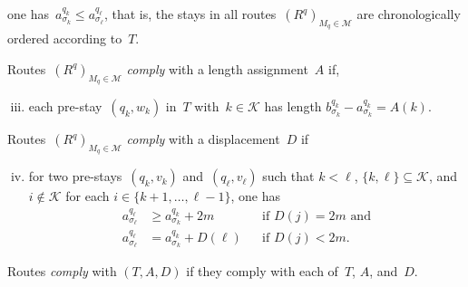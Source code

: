 \documentclass[natbib,sort,smallextended,envcountsame,envcountsect,numbook]{svjour3}
\newcommand{\ps}{pre-stay}
\newcommand{\las}{length assignment}
\newcommand{\dis}{displacement}
\newcommand{\Ms}{\mathcal M}
\newcommand{\nmach}{m}
\begin{document}
\begin{definition}
\begin{enumerate}[(i)]
  one has~\(a_{\sigma_k}^{q_k}\leq a_{\sigma_{\ell}}^{q_\ell}\), that is,
  the stays in all routes~\((R^{q})_{M_q\in\Ms}\) are chronologically ordered according to~\(T\).
\end{enumerate}
  Routes~\((R^q)_{M_q\in\Ms}\)  \emph{comply} with a \las~\(A\) if,
\begin{enumerate}[(i)]
\setcounter{enumi}{2}
\item\label{la1} each \ps{}~\((q_k,w_k)\) in~\(T\) with~\(k\in\mathcal K\)
has length \(b_{\sigma_k}^{q_k}-a_{\sigma_k}^{q_k}=A(k)\).
\end{enumerate}
Routes~\((R^q)_{M_q\in\Ms}\)  \emph{comply} with a \dis~\(D\) if
\begin{enumerate}[(i)]
\setcounter{enumi}{3}
\item\label{dis1} for two \ps{}s~\(({q_k},v_k)\) and~\(({q_\ell},v_\ell)\) such that \(k<\ell\), \(\{k,\ell\}\subseteq\mathcal K\), and \(i\notin\mathcal K\) for each \(i\in\{k+1,\dots,\ell-1\}\), one has
  \begin{align*}
    a_{\sigma_\ell}^{q_\ell}&\geq a_{\sigma_k}^{q_k}+2m&&\text{if~\(D(j)=2\nmach\) and}\\
    a_{\sigma_\ell}^{q_\ell}&=a_{\sigma_k}^{q_k}+D(\ell)&&\text{if~\(D(j)<2\nmach\).}
  \end{align*}
\end{enumerate}
Routes \emph{comply} with \((T,A,D)\) if they comply with each of~\(T\), \(A\), and~\(D\).
\end{definition}
\end{document}
